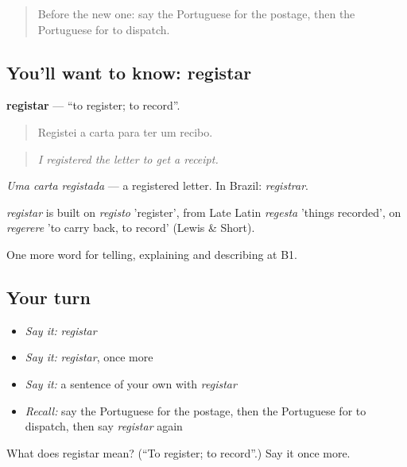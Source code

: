 \label{lesson:PT-C454-registar}



\begin{quote}
Before the new one: say the Portuguese for the postage, then the Portuguese for to dispatch.
\end{quote}

\subsection*{You'll want to know: registar}
\textbf{registar} — \textquotedblleft{}to register; to record\textquotedblright{}.

\begin{quote}
Registei a carta para ter um recibo.
\end{quote}

\begin{quote}
\emph{I registered the letter to get a receipt.}
\end{quote}

\emph{Uma carta registada} — a registered letter. In Brazil: \emph{registrar}.

\begin{cousinweb}
\emph{registar} is built on \emph{registo} 'register', from Late Latin \emph{regesta} 'things recorded', on \emph{regerere} 'to carry back, to record' (Lewis \& Short).
\end{cousinweb}

\begin{grammarlens}[title={What you've built}]
One more word for telling, explaining and describing at B1.
\end{grammarlens}

\subsection*{Your turn}
\begin{itemize}
\raggedright
  \item \emph{Say it:} \emph{registar}
  \item \emph{Say it:} \emph{registar}, once more
  \item \emph{Say it:} a sentence of your own with \emph{registar}
  \item \emph{Recall:} say the Portuguese for the postage, then the Portuguese for to dispatch, then say \emph{registar} again
\end{itemize}

\begin{tcolorbox}[breakable,colback=teal!4,colframe=teal!35!black,title={Before you move on}]
What does registar mean? (\textquotedblleft{}To register; to record\textquotedblright{}.) Say it once more.
\end{tcolorbox}
